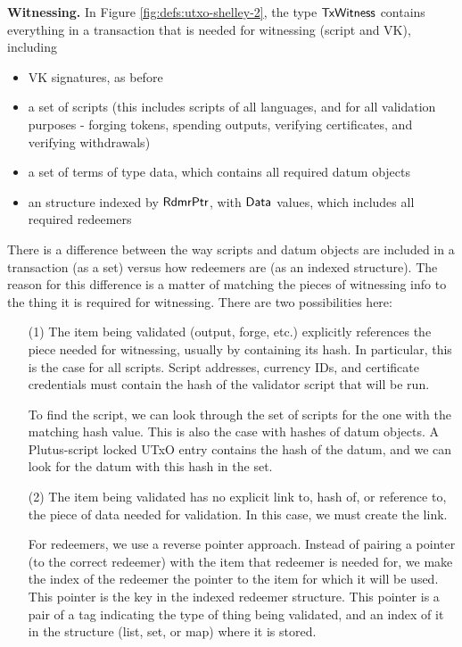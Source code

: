 \textbf{Witnessing.}
In Figure \ref{fig:defs:utxo-shelley-2}, the type $\mathsf{TxWitness}$ contains everything
in a transaction that is needed for witnessing (script and VK), including

\begin{itemize}
  \item VK signatures, as before
  \item a set of scripts (this includes scripts of all languages, and for all
  validation purposes - forging tokens, spending outputs, verifying certificates, and
  verifying withdrawals)
  \item a set of terms of type data, which contains all required datum objects
  \item an structure indexed by $\mathsf{RdmrPtr}$, with $\mathsf{Data}$ values, which includes all
  required redeemers
\end{itemize}

There is a difference between the way scripts and datum objects are included in
a transaction (as a set) versus how redeemers are
(as an indexed structure). The reason for this difference is a matter of matching
the pieces of witnessing info to the thing it is required for witnessing. There
are two possibilities here:

\begin{itemize}
  \item[(1)] The item being validated (output, forge, etc.) explicitly references
  the piece needed for witnessing, usually by containing its hash.
  In particular, this is the case for all scripts.
  Script addresses, currency IDs, and certificate credentials must contain
  the hash of the validator script that will be run.

  To find the script, we can look through
  the set of scripts for the one with the matching hash value.
  This is also the case with hashes of datum objects. A Plutus-script locked
  UTxO entry contains the hash of the datum, and we can look for
  the datum with this hash in the set.

  \item[(2)] The item being validated has no explicit link to, hash of, or
  reference to, the piece of data needed for validation. In this case, we must create
  the link.

  For redeemers, we use a reverse pointer approach. Instead of pairing
  a pointer (to the correct redeemer) with the item that redeemer is needed for,
  we make the index of the redeemer the pointer to the item for
  which it will be used. This pointer is the key in the indexed redeemer structure.
  This pointer is a pair of a tag indicating the type of
  thing being validated, and an index of it in the structure (list, set, or map)
  where it is stored.
\end{itemize}

